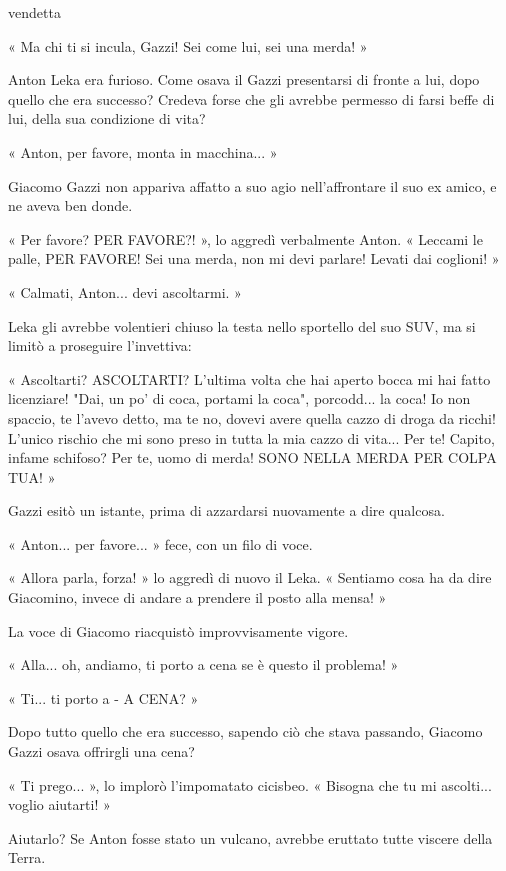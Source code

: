 vendetta


« Ma chi ti si incula, Gazzi! Sei come lui, sei una merda! »

Anton Leka era furioso. Come osava il Gazzi presentarsi di fronte a lui, dopo quello che era successo? Credeva forse che gli avrebbe permesso di farsi beffe di lui, della sua condizione di vita?

« Anton, per favore, monta in macchina... »

Giacomo Gazzi non appariva affatto a suo agio nell'affrontare il suo ex amico, e ne aveva ben donde.

« Per favore? PER FAVORE?! », lo aggredì verbalmente Anton. « Leccami le palle, PER FAVORE! Sei una merda, non mi devi parlare! Levati dai coglioni! »

« Calmati, Anton... devi ascoltarmi. »

Leka gli avrebbe volentieri chiuso la testa nello sportello del suo SUV, ma si limitò a proseguire l'invettiva: 

« Ascoltarti? ASCOLTARTI? L'ultima volta che hai aperto bocca mi hai fatto licenziare! "Dai, un po' di coca, portami la coca", porcodd... la coca! Io non spaccio, te l'avevo detto, ma te no, dovevi avere quella cazzo di droga da ricchi! L'unico rischio che mi sono preso in tutta la mia cazzo di vita... Per te! Capito, infame schifoso? Per te, uomo di merda! SONO NELLA MERDA PER COLPA TUA! »

Gazzi esitò un istante, prima di azzardarsi nuovamente a dire qualcosa.

« Anton... per favore... » fece, con un filo di voce.

« Allora parla, forza! » lo aggredì di nuovo il Leka. « Sentiamo cosa ha da dire Giacomino, invece di andare a prendere il posto alla mensa! »

La voce di Giacomo riacquistò improvvisamente vigore.

« Alla... oh, andiamo, ti porto a cena se è questo il problema! »

« Ti... ti porto a - A CENA? »

Dopo tutto quello che era successo, sapendo ciò che stava passando, Giacomo Gazzi osava offrirgli una cena?

« Ti prego... », lo implorò l'impomatato cicisbeo. « Bisogna che tu mi ascolti... voglio aiutarti! »

Aiutarlo? Se Anton fosse stato un vulcano, avrebbe eruttato tutte viscere della Terra.

